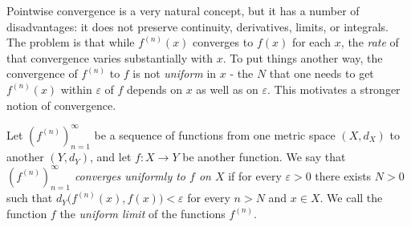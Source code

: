 \begin{note}
    Pointwise convergence is a very natural concept, but it has a number of disadvantages:
    it does not preserve continuity, derivatives, limits, or integrals.
    The problem is that while \(f^{(n)}(x)\) converges to \(f(x)\) for each \(x\), the \emph{rate} of that convergence varies substantially with \(x\).
    To put things another way, the convergence of \(f^{(n)}\) to \(f\) is not \emph{uniform} in \(x\)
    - the \(N\) that one needs to get \(f^{(n)}(x)\) within \(\varepsilon\) of \(f\) depends on \(x\) as well as on \(\varepsilon\).
    This motivates a stronger notion of convergence.
\end{note}

\begin{definition}\label{3.2.7}
    Let \((f^{(n)})_{n = 1}^\infty\) be a sequence of functions from one metric space \((X, d_X)\) to another \((Y, d_Y)\), and let \(f : X \to Y\) be another function.
    We say that \emph{\((f^{(n)})_{n = 1}^\infty\) converges uniformly to \(f\) on \(X\)} if for every \(\varepsilon > 0\) there exists \(N > 0\) such that \(d_Y\big(f^{(n)}(x), f(x)\big) < \varepsilon\) for every \(n > N\) and \(x \in X\).
    We call the function \(f\) the \emph{uniform limit} of the functions \(f^{(n)}\).
\end{definition}